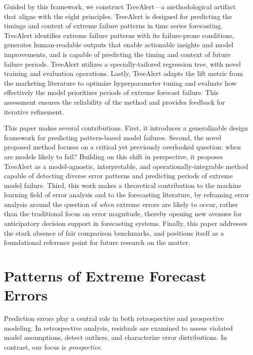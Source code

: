 \documentclass[]{interact}
\theoremstyle{plain}
\theoremstyle{definition}
\theoremstyle{remark}
\begin{document}
Guided by this framework, we construct TreeAlert---a methodological artifact that aligns with the eight principles. TreeAlert is designed for predicting the timings and context of extreme failure patterns in time series forecasting. TreeAlert identifies extreme failure patterns with its failure-prone conditions, generates human-readable outputs that enable actionable insights and model improvements, and is capable of predicting the timing and context of future failure periods. TreeAlert utilizes a specially-tailored regression tree, with novel training and evaluation operations. Lastly, TreeAlert adapts the lift metric from the marketing literature to optimize hyperparameter tuning and evaluate how effectively the model prioritizes periods of extreme forecast failure. This assessment ensures the reliability of the method and provides feedback for iterative refinement.

This paper makes several contributions. First, it introduces a generalizable design framework for predicting pattern-based model failures. Second, the novel proposed method focuses on a critical yet previously overlooked question: when are models likely to fail? Building on this shift in perspective, it proposes TreeAlert as a model-agnostic, interpretable, and operationally-integrable method capable of detecting diverse error patterns and predicting periods of extreme model failure. Third, this work makes a theoretical contribution to the machine learning field of error analysis and to the forecasting literature, by reframing error analysis around the question of \emph{when} extreme errors are likely to occur, rather than the traditional focus on error magnitude, thereby opening new avenues for anticipatory decision support in forecasting systems. Finally, this paper addresses the stark absence of fair comparison benchmarks, and positions itself as a foundational reference point for future research on the matter.

\section{Patterns of Extreme Forecast Errors}
\label{sec:patterns}
Prediction errors play a central role in both retrospective and prospective modeling. In retrospective analysis, residuals are examined to assess violated model assumptions, detect outliers, and characterize error distributions. In contrast, our focus is \emph{prospective}.
\end{document}
